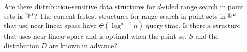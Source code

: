 \documentclass[charterfonts]{patmorin}
\begin{document}
\begin{op}
Are there distribution-sensitive data structures for $d$-sided range
search in point sets in $\mathbb{R}^d$?  The current fastest structures
for range search in point sets in $\mathbb{R}^d$ that use near-linear space have
$\Theta(\log^{d-1} n)$ query time.  Is there a structure that uses
near-linear space and is optimal
when the point set $S$ and the distribution $D$ are known in advance?
\end{op}
\end{document}
